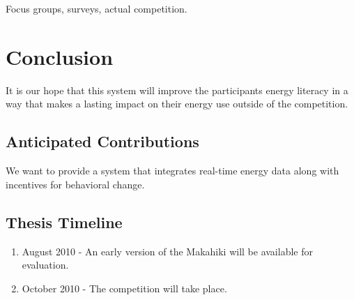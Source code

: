 Focus groups, surveys, actual competition.

\chapter{Conclusion}
\label{conclusion}

It is our hope that this system will improve the participants energy literacy in a way that makes a lasting impact on their energy use outside of the competition.

\section{Anticipated Contributions}

We want to provide a system that integrates real-time energy data along with incentives for behavioral change.

\section{Thesis Timeline}

\begin{enumerate}
\item August 2010 - An early version of the Makahiki will be available for evaluation.
\item October 2010 - The competition will take place.
\end{enumerate}